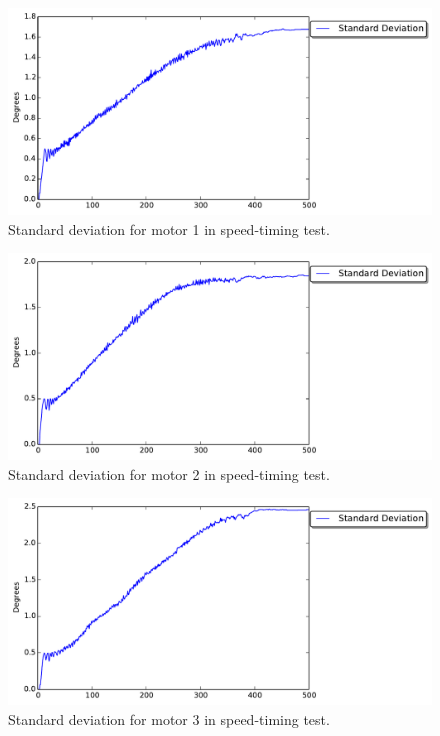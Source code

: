 \begin{figure}[ht]
\includegraphics[width=\textwidth]{test_res/speed_tests/StandardDeviation_motor_1.pdf}
\caption{Standard deviation for motor 1 in speed-timing test.}
\label{fig:stand_1}
\end{figure}


\begin{figure}[ht]
\includegraphics[width=\textwidth]{test_res/speed_tests/StandardDeviation_motor_2.pdf}
\caption{Standard deviation for motor 2 in speed-timing test.}
\label{fig:stand_2}
\end{figure}

\begin{figure}[ht]
\includegraphics[width=\textwidth]{test_res/speed_tests/StandardDeviation_motor_3.pdf}
\caption{Standard deviation for motor 3 in speed-timing test.}
\label{fig:stand_3}
\end{figure}

